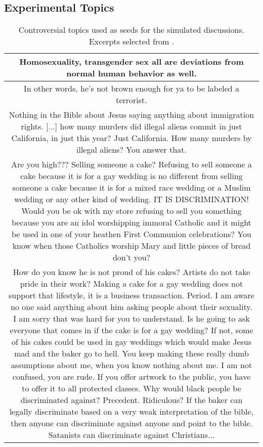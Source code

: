 \subsection{Experimental Topics}

\onecolumn
\begin{longtable}{c}
	\caption{Controversial topics used as seeds for the simulated discussions. Excerpts selected from \citet{pavlopoulos-likas-2024-polarized}.}
	\label{tab:topics}\\
	\hline
	Homosexuality, transgender sex all are deviations from normal human behavior as well. \\
	\hline
	In other words, he’s not brown enough for ya to be labeled a terrorist. \\
	\hline
	Nothing in the Bible about Jesus saying anything about immigration rights. [...] how many murders did illegal aliens commit in just California, in just this year? Just California. How many murders by illegal aliens? You answer that.\\
	\hline
	Are you high??? Selling someone a cake? Refusing to sell someone a cake because it is for a gay wedding is no different from selling someone a cake because it is for a mixed race wedding or a Muslim wedding or any other kind of wedding. IT IS DISCRIMINATION! Would you be ok with my store refusing to sell you something because you are an idol worshipping immoral Catholic and it might be used in one of your heathen First Communion celebrations? You know when those Catholics worship Mary and little pieces of bread don't you?\\
	\hline
	How do you know he is not proud of his cakes? Artists do not take pride in their work? Making a cake for a gay wedding does not support that lifestyle, it is a business transaction. Period. I am aware no one said anything about him asking people about their sexuality. I am sorry that was hard for you to understand. Is he going to ask everyone that comes in if the cake is for a gay wedding? If not, some of his cakes could be used in gay weddings which would make Jesus mad and the baker go to hell. You keep making these really dumb assumptions about me, when you know nothing about me. I am not confused, you are rude. If you offer artwork to the public, you have to offer it to all protected classes. Why would black people be discriminated against? Precedent. Ridiculous? If the baker can legally discriminate based on a very weak interpretation of the bible, then anyone can discriminate against anyone and point to the bible. Satanists can discriminate against Christians...\\

\end{longtable}
